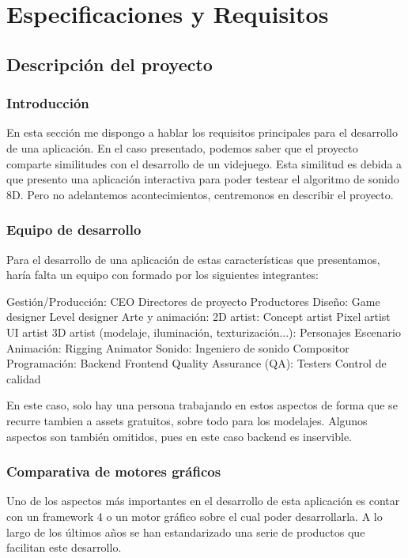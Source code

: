 \section{Especificaciones y Requisitos}

\subsection{Descripción del proyecto}
\subsubsection{Introducción}
\quad En esta sección me dispongo a hablar los requisitos principales para el desarrollo de una aplicación. En el caso presentado, podemos saber que el proyecto comparte similitudes con el desarrollo de un videjuego. Esta similitud es debida a que presento una aplicación interactiva para poder testear el algoritmo de sonido 8D. Pero no adelantemos acontecimientos, centremonos en describir el proyecto.

\subsubsection{Equipo de desarrollo}
\quad Para el desarrollo de una aplicación de estas características que presentamos, haría falta un equipo con formado por los siguientes integrantes:\\
\begin{outline}
\1 Gestión/Producción:
	\2 CEO
	\2 Directores de proyecto
	\2 Productores	
\1 Diseño:
	\2 Game designer
	\2 Level designer
\1 Arte y animación:
	\2 2D artist:
		\3 Concept artist
		\3 Pixel artist
		\3 UI artist
	\2 3D artist (modelaje, iluminación, texturización...):
		\3 Personajes
		\3 Escenario
\1 Animación:
	\2 Rigging
	\2 Animator
\1 Sonido:
	\2 Ingeniero de sonido
	\2 Compositor
\1 Programación:
	\2 Backend
	\2 Frontend
\1 Quality Assurance (QA):
	\2 Testers
	\2 Control de calidad 
\end{outline}

\quad En este caso, solo hay una persona trabajando en estos aspectos de forma que se recurre tambien a assets gratuitos, sobre todo para los modelajes. Algunos aspectos son también omitidos, pues en este caso backend es inservible.

\subsubsection{Comparativa de motores gráficos}
\quad Uno de los aspectos más importantes en el desarrollo de esta aplicación es contar con un framework 4 o un motor gráfico sobre el cual poder desarrollarla. A lo largo de
los últimos años se han estandarizado una serie de productos que facilitan este desarrollo.\\

